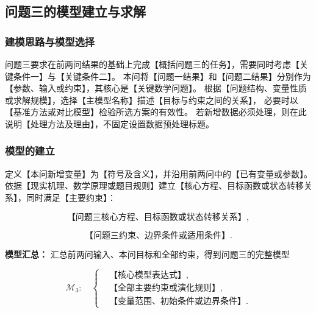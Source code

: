 
\subsection{问题三的模型建立与求解}

\subsubsection{建模思路与模型选择}

问题三要求在前两问结果的基础上完成【概括问题三的任务】，需要同时考虑【关键条件一】与【关键条件二】。
本问将【问题一结果】和【问题二结果】分别作为【参数、输入或约束】，其核心是【关键数学问题】。
根据【问题结构、变量性质或求解规模】，选择【主模型名称】描述【目标与约束之间的关系】，
必要时以【基准方法或对比模型】检验所选方案的有效性。
若新增数据必须处理，则在此说明【处理方法及理由】，不固定设置数据预处理标题。

\subsubsection{模型的建立}

定义【本问新增变量】为【符号及含义】，并沿用前两问中的【已有变量或参数】。
依据【现实机理、数学原理或题目规则】建立【核心方程、目标函数或状态转移关系】，同时满足【主要约束】：

\begin{equation}
  \text{【问题三核心方程、目标函数或状态转移关系】},
  \label{eq:q3_core}
\end{equation}

\begin{equation}
  \text{【问题三约束、边界条件或适用条件】}.
  \label{eq:q3_constraint}
\end{equation}

\noindent\textbf{模型汇总：}
汇总前两问输入、本问目标和全部约束，得到问题三的完整模型

\begin{equation}
  \mathcal{M}_3:\quad
  \left\{
  \begin{aligned}
    &\text{【核心模型表达式】},\\
    &\text{【全部主要约束或演化规则】},\\
    &\text{【变量范围、初始条件或边界条件】}.
  \end{aligned}
  \right.
  \label{eq:q3_summary}
\end{equation}

